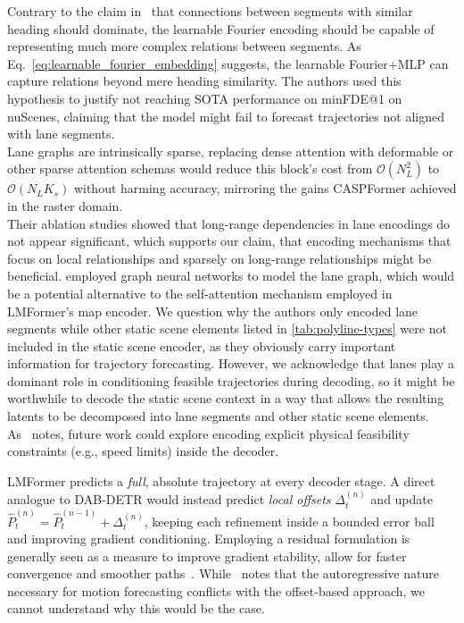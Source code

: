 \begin{description}[itemsep=0.5em]

\item[\textbf{Static Context Limitations}]
  \item Contrary to the claim in~\cite{lmformerYadav2025} that connections between segments with similar heading should dominate, the learnable Fourier encoding should be capable of representing much more complex relations between segments. As Eq.~\eqref{eq:learnable_fourier_embedding} suggests, the learnable Fourier+MLP can capture relations beyond mere heading similarity. The authors used this hypothesis to justify not reaching SOTA performance on minFDE@1 on nuScenes, claiming that the model might fail to forecast trajectories not aligned with lane segments.\\

Lane graphs are intrinsically sparse, replacing dense attention with deformable or other sparse attention schemas would reduce this block's cost from \(\mathcal{O}(N_L^2)\) to \(\mathcal{O}(N_L K_s)\) without harming accuracy, mirroring the gains CASPFormer achieved in the raster domain.\\
  Their ablation studies showed that long-range dependencies in lane encodings do not appear significant, which supports our claim, that encoding mechanisms that focus on local relationships and sparsely on long-range relationships might be beneficial. \cite{qcnetZhou2023} employed graph neural networks to model the lane graph, which would be a potential alternative to the self-attention mechanism employed in LMFormer's map encoder.
  We question why the authors only encoded lane segments while other static scene elements listed in \autoref{tab:polyline-types} were not included in the static scene encoder, as they obviously carry important information for trajectory forecasting. However, we acknowledge that lanes play a dominant role in conditioning feasible trajectories during decoding, so it might be worthwhile to decode the static scene context in a way that allows the resulting latents to be decomposed into lane segments and other static scene elements.\\

As~\cite{lmformerYadav2025} notes, future work could explore encoding explicit physical feasibility constraints (e.g., speed limits) inside the decoder.

\item[\textbf{Offset-based Refinement}]
LMFormer predicts a \emph{full}, absolute trajectory at every decoder stage. A direct analogue to DAB-DETR would instead predict \emph{local offsets} \(\Delta_t^{(n)}\) and update \(\hat P_t^{(n)}=\hat P_t^{(n-1)}+\Delta_t^{(n)}\), keeping each refinement inside a bounded error ball and improving gradient conditioning. Employing a residual formulation is generally seen as a measure to improve gradient stability, allow for faster convergence and smoother paths~\cite{liu2022dabdetr}. While~\cite{lmformerYadav2025} notes that the autoregressive nature necessary for motion forecasting conflicts with the offset-based approach, we cannot understand why this would be the case.


\end{description}

